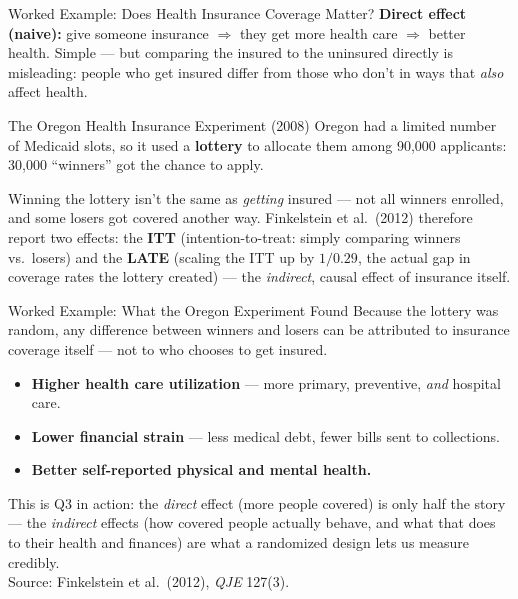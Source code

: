 \documentclass[11pt,aspectratio=169]{beamer}
\newcommand{\srcnote}[1]{{\footnotesize\color{wugray}Source: #1}}
\begin{document}
\begin{frame}{Worked Example: Does Health Insurance Coverage Matter?}
  \textbf{Direct effect (naive):} give someone insurance $\Rightarrow$ they get more health care $\Rightarrow$ better health. Simple --- but comparing the insured to the uninsured directly is misleading: people who get insured differ from those who don't in ways that \emph{also} affect health.
  \begin{block}{The Oregon Health Insurance Experiment (2008)}
    Oregon had a limited number of Medicaid slots, so it used a \textbf{lottery} to allocate them among 90{,}000 applicants: 30{,}000 ``winners'' got the chance to apply.
  \end{block}
  \small Winning the lottery isn't the same as \emph{getting} insured --- not all winners enrolled, and some losers got covered another way. Finkelstein et al.\ (2012) therefore report two effects: the \textbf{ITT} (intention-to-treat: simply comparing winners vs.\ losers) and the \textbf{LATE} (scaling the ITT up by $1/0.29$, the actual gap in coverage rates the lottery created) --- the \emph{indirect}, causal effect of insurance itself.
\end{frame}

\begin{frame}{Worked Example: What the Oregon Experiment Found}
  Because the lottery was random, any difference between winners and losers can be attributed to insurance coverage itself --- not to who chooses to get insured.
  \begin{itemize}
    \item \textbf{Higher health care utilization} --- more primary, preventive, \emph{and} hospital care.
    \item \textbf{Lower financial strain} --- less medical debt, fewer bills sent to collections.
    \item \textbf{Better self-reported physical and mental health.}
  \end{itemize}
  \vspace{0.4em}
  \small This is Q3 in action: the \emph{direct} effect (more people covered) is only half the story --- the \emph{indirect} effects (how covered people actually behave, and what that does to their health and finances) are what a randomized design lets us measure credibly.\\
  \srcnote{Finkelstein et al.\ (2012), \emph{QJE} 127(3).}
\end{frame}
\end{document}
